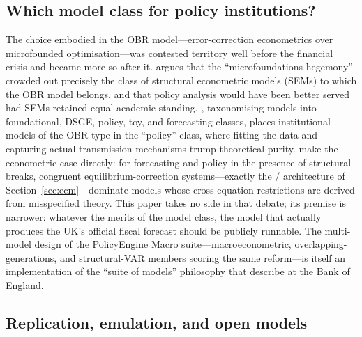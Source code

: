 \subsection{Which model class for policy institutions?}

The choice embodied in the OBR model---error-correction econometrics over microfounded optimisation---was contested territory well before the financial crisis and became more so after it. \citet{wrenlewis2018} argues that the ``microfoundations hegemony'' crowded out precisely the class of structural econometric models (SEMs) to which the OBR model belongs, and that policy analysis would have been better served had SEMs retained equal academic standing. \citet{blanchard2018}, taxonomising models into foundational, DSGE, policy, toy, and forecasting classes, places institutional models of the OBR type in the ``policy'' class, where fitting the data and capturing actual transmission mechanisms trump theoretical purity. \citet{hendry2018} make the econometric case directly: for forecasting and policy in the presence of structural breaks, congruent equilibrium-correction systems---exactly the \citet{davidson1978}/\citet{engle1987} architecture of Section~\ref{sec:ecm}---dominate models whose cross-equation restrictions are derived from misspecified theory. This paper takes no side in that debate; its premise is narrower: whatever the merits of the model class, the model that actually produces the UK's official fiscal forecast should be publicly runnable. The multi-model design of the PolicyEngine Macro suite---macroeconometric, overlapping-generations, and structural-VAR members scoring the same reform---is itself an implementation of the ``suite of models'' philosophy that \citet{burgess2013} describe at the Bank of England.

\subsection{Replication, emulation, and open models}

